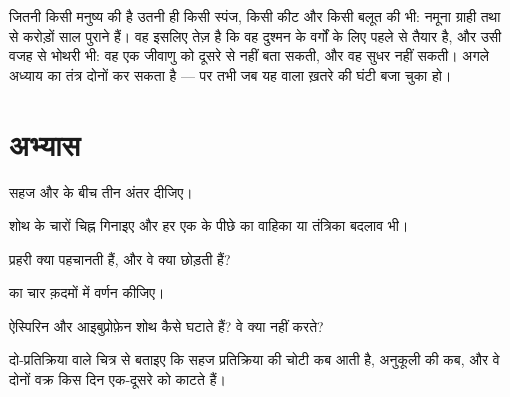\begin{remark}[पुरानी, तेज़ और भोथरी]\label{rem:g12:innate-immunity:old}
 जितनी किसी मनुष्य की है उतनी ही किसी स्पंज, किसी कीट और किसी
बलूत की भी: नमूना ग्राही तथा   से करोड़ों साल पुराने
हैं। वह इसलिए तेज़ है कि वह दुश्मन के वर्गों के लिए पहले से तैयार है, और उसी
वजह से भोथरी भी: वह एक जीवाणु को दूसरे से नहीं बता सकती, और वह सुधर नहीं
सकती। अगले अध्याय का तंत्र दोनों कर सकता है --- पर तभी जब यह वाला ख़तरे की
घंटी बजा चुका हो।
\end{remark}

\section{अभ्यास}

\begin{exercise}[$\star$]\label{exo:g12:innate-immunity:1}
सहज और  के बीच तीन अंतर दीजिए।
\end{exercise}

\begin{exercise}[$\star$]\label{exo:g12:innate-immunity:2}
शोथ के चारों चिह्न गिनाइए और हर एक के पीछे का वाहिका या तंत्रिका बदलाव भी।
\end{exercise}

\begin{exercise}[$\star$]\label{exo:g12:innate-immunity:3}
प्रहरी  क्या पहचानती हैं, और वे क्या छोड़ती हैं?
\end{exercise}

\begin{exercise}[$\star$]\label{exo:g12:innate-immunity:4}
 का चार क़दमों में वर्णन कीजिए।
\end{exercise}

\begin{exercise}[$\star$]\label{exo:g12:innate-immunity:5}
ऐस्पिरिन और आइबुप्रोफ़ेन शोथ कैसे घटाते हैं? वे क्या नहीं करते?
\end{exercise}

\begin{exercise}[$\star\star$]\label{exo:g12:innate-immunity:6}
दो-प्रतिक्रिया वाले चित्र से बताइए कि सहज प्रतिक्रिया की चोटी कब आती है,
अनुकूली की कब, और वे दोनों वक्र किस दिन एक-दूसरे को काटते हैं।
\end{exercise}

